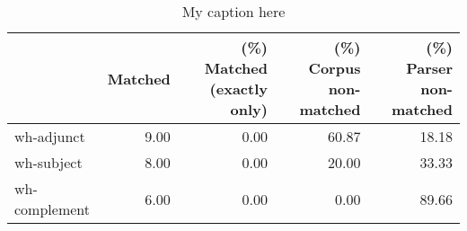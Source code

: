 \begin{table}[!ht]
\centering
\begin{tabular}{lrrrr}
\toprule
{} &  Matched &  (\%) Matched (exactly only) &  (\%) Corpus non-matched &  (\%) Parser non-matched \\
\midrule
wh-adjunct    &     9.00 &                        0.00 &                   60.87 &                   18.18 \\
wh-subject    &     8.00 &                        0.00 &                   20.00 &                   33.33 \\
wh-complement &     6.00 &                        0.00 &                    0.00 &                   89.66 \\
\bottomrule
\end{tabular}
\caption{My caption here}
\label{tab:WH-ocd-relative}
\end{table}